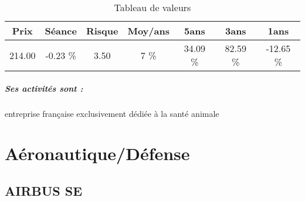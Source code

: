 \documentclass[11pt,a4paper]{report}%
\begin{document}
\begin{table}[H]
  \centering
    \begin{tabular}{|c|c|c|c|c|c|c|}
    \hline
    Prix & Séance & Risque  & Moy/ans & 5ans & 3ans & 1ans \\
    \hline
    214.00 &    -0.23 \%    & 3.50 & 7 \% & 34.09 \% & 82.59 \% & -12.65 \% \\
    \hline
    \end{tabular}%
        \label{tab:table_VIRBAC SA}%
      \caption{Tableau de valeurs}
\end{table}%

\paragraph{Ses activités sont : } entreprise française exclusivement dédiée à la santé animale  
    
    \newpage\chapter{Aéronautique/Défense}


\section{AIRBUS SE}
\end{document}
